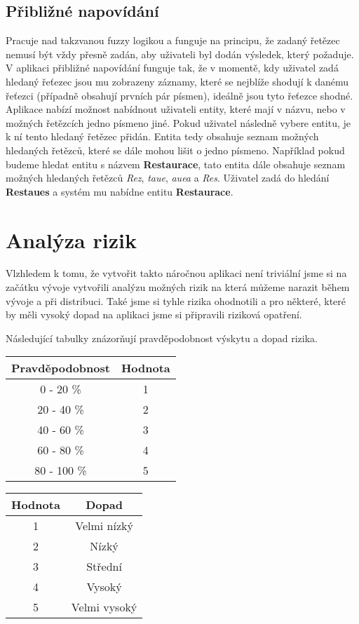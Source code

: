 \subsection{Přibližné napovídání}
\par Pracuje nad takzvanou fuzzy logikou a funguje na principu, že zadaný řetězec nemusí být vždy přesně zadán, aby uživateli byl dodán výsledek, který požaduje. V aplikaci přibližné napovídání funguje tak, že v momentě, kdy uživatel zadá hledaný řeťezec jsou mu zobrazeny záznamy, které se nejblíže shodují k danému řeťezci (případně obsahují prvních pár písmen), ideálně jsou tyto řeťezce shodné. Aplikace nabízí možnost nabídnout uživateli entity, které mají v názvu, nebo v možných řetězcích jedno písmeno jiné. Pokud uživatel následně vybere entitu, je k ní tento hledaný řetězec přidán. Entita tedy obsahuje seznam možných hledaných řetězců, které se dále mohou lišit o jedno písmeno. Například pokud budeme hledat entitu s názvem \textbf{Restaurace}, tato entita dále obsahuje seznam možných hledaných řetězců \textit{Rez}, \textit{taue}, \textit{auea} a \textit{Res}. Uživatel zadá do hledání \textbf{Restaues} a systém mu nabídne entitu \textbf{Restaurace}.

\section{Analýza rizik}
\par Vlzhledem k tomu, že vytvořit takto náročnou aplikaci není triviální jsme si na začátku vývoje vytvořili analýzu možných rizik na která můžeme narazit během vývoje a při distribuci. Také jsme si tyhle rizika ohodnotili a pro některé, které by měli vysoký dopad na aplikaci jsme si připravili riziková opatření.

\par Následující tabulky znázorňují pravděpodobnost výskytu a dopad rizika.

\begin{tabular}{|c | c |}
\hline
Pravděpodobnost&Hodnota\\
\hline
0 - 20 \%&1\\
\hline
20 - 40 \%&2\\
\hline
40 - 60 \%&3\\
\hline
60 - 80 \%&4\\
\hline
80 - 100 \%&5\\
\hline
\end{tabular}
\qquad\qquad\qquad\qquad
\begin{tabular}{|c | c |}
\hline
Hodnota&Dopad\\
\hline
1&Velmi nízký\\
\hline
2&Nízký\\
\hline
3&Střední\\
\hline
4&Vysoký\\
\hline
5&Velmi vysoký\\
\hline
\end{tabular}

